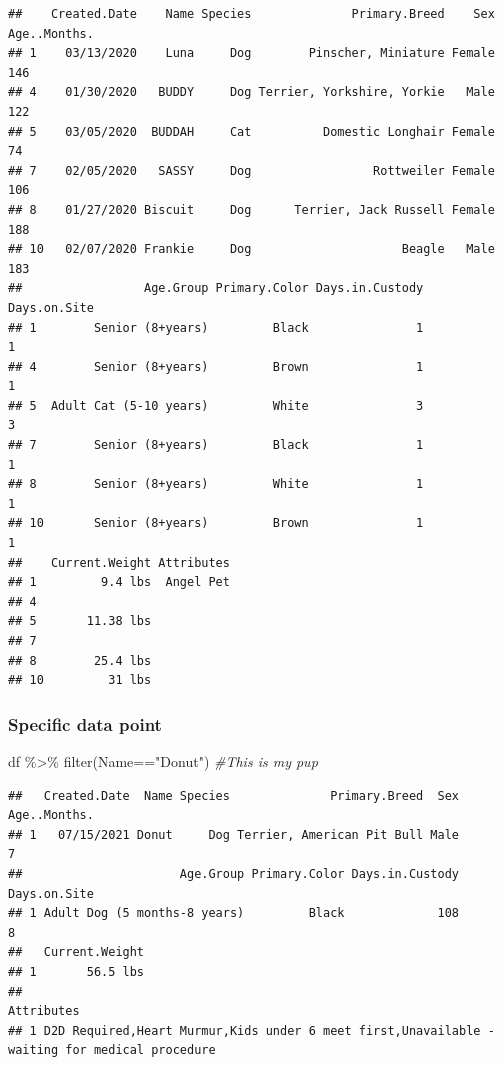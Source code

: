 \documentclass[
]{article}
\newenvironment{Shaded}{\begin{snugshade}}{\end{snugshade}}
\newcommand{\CommentTok}[1]{\textcolor[rgb]{0.56,0.35,0.01}{\textit{#1}}}
\newcommand{\FunctionTok}[1]{\textcolor[rgb]{0.00,0.00,0.00}{#1}}
\newcommand{\NormalTok}[1]{#1}
\newcommand{\SpecialCharTok}[1]{\textcolor[rgb]{0.00,0.00,0.00}{#1}}
\newcommand{\StringTok}[1]{\textcolor[rgb]{0.31,0.60,0.02}{#1}}
\begin{document}
\begin{verbatim}
##    Created.Date    Name Species              Primary.Breed    Sex Age..Months.
## 1    03/13/2020    Luna     Dog        Pinscher, Miniature Female          146
## 4    01/30/2020   BUDDY     Dog Terrier, Yorkshire, Yorkie   Male          122
## 5    03/05/2020  BUDDAH     Cat          Domestic Longhair Female           74
## 7    02/05/2020   SASSY     Dog                 Rottweiler Female          106
## 8    01/27/2020 Biscuit     Dog      Terrier, Jack Russell Female          188
## 10   02/07/2020 Frankie     Dog                     Beagle   Male          183
##                 Age.Group Primary.Color Days.in.Custody Days.on.Site
## 1        Senior (8+years)         Black               1            1
## 4        Senior (8+years)         Brown               1            1
## 5  Adult Cat (5-10 years)         White               3            3
## 7        Senior (8+years)         Black               1            1
## 8        Senior (8+years)         White               1            1
## 10       Senior (8+years)         Brown               1            1
##    Current.Weight Attributes
## 1         9.4 lbs  Angel Pet
## 4                           
## 5       11.38 lbs           
## 7                           
## 8        25.4 lbs           
## 10         31 lbs
\end{verbatim}

\hypertarget{specific-data-point}{%
\subsubsection{Specific data point}\label{specific-data-point}}

\begin{Shaded}
\begin{Highlighting}[]
\NormalTok{df }\SpecialCharTok{\%\textgreater{}\%} \FunctionTok{filter}\NormalTok{(Name}\SpecialCharTok{==}\StringTok{"Donut"}\NormalTok{) }\CommentTok{\#This is my pup}
\end{Highlighting}
\end{Shaded}

\begin{verbatim}
##   Created.Date  Name Species              Primary.Breed  Sex Age..Months.
## 1   07/15/2021 Donut     Dog Terrier, American Pit Bull Male            7
##                      Age.Group Primary.Color Days.in.Custody Days.on.Site
## 1 Adult Dog (5 months-8 years)         Black             108            8
##   Current.Weight
## 1       56.5 lbs
##                                                                                      Attributes
## 1 D2D Required,Heart Murmur,Kids under 6 meet first,Unavailable - waiting for medical procedure
\end{verbatim}
\end{document}
